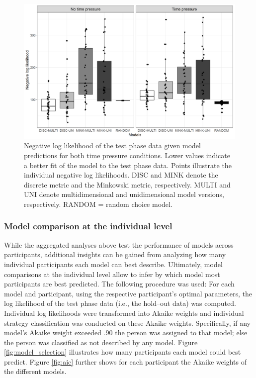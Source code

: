 \documentclass[a4paper,man,natbib]{apa6}
\begin{document}
\begin{figure}[htbp]
\centering
\includegraphics[width = \textwidth]{fig_log_lik.png}
\caption{Negative log likelihood of the test phase data given model predictions for both time pressure conditions. Lower values indicate a better fit of the model to the test phase data. Points illustrate the individual negative log likelihoods. DISC and MINK denote the discrete metric and the Minkowski metric, respectively. MULTI and UNI denote multidimensional and unidimensional model versions, respectively. RANDOM = random choice model.}
\label{fig:log_lik}
\end{figure}

\subsubsection{Model comparison at the individual level} \label{sec:res_ind}
While the aggregated analyses above test the performance of models across participants, additional insights can be gained from analyzing how many individual participants each model can best describe. Ultimately, model comparisons at the individual level allow to infer by which model most participants are best predicted. 
The following procedure was used: For each model and participant, using the respective participant's optimal parameters, the log likelihood of the test phase data (i.e., the hold--out data) was computed. Individual log likelihoods were transformed into Akaike weights \citep{wagenmakers2004aic} and individual strategy classification was conducted on these Akaike weights. Specifically, if any model’s Akaike weight exceeded .90 the person was assigned to that model; else the person was classified as not described by any model. Figure \ref{fig:model_selection} illustrates how many participants each model could best predict. Figure \ref{fig:aic} further shows for each participant the Akaike weights of the different models.
\end{document}
